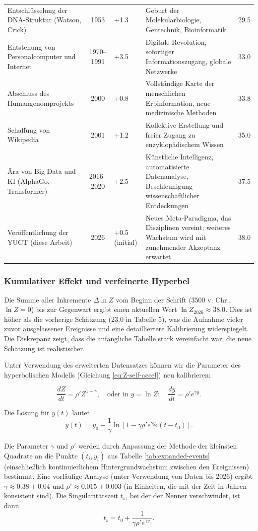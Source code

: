 \documentclass[12pt,a4paper]{article}
\theoremstyle{remark}
\begin{document}
\begin{table}[htbp]
\begin{tabular}{p{3.2cm} c p{2.5cm} p{4.5cm} c}
			Entschlüsselung der DNA-Struktur (Watson, Crick) & 1953 & +1.3 & Geburt der Molekularbiologie, Gentechnik, Bioinformatik & 29.5 \\
			Entstehung von Personalcomputer und Internet & 1970–1991 & +3.5 & Digitale Revolution, sofortiger Informationszugang, globale Netzwerke & 33.0 \\
			Abschluss des Humangenomprojekts & 2000 & +0.8 & Vollständige Karte der menschlichen Erbinformation, neue medizinische Methoden & 33.8 \\
			Schaffung von Wikipedia & 2001 & +1.2 & Kollektive Erstellung und freier Zugang zu enzyklopädischem Wissen & 35.0 \\
			Ära von Big Data und KI (AlphaGo, Transformer) & 2016–2020 & +2.5 & Künstliche Intelligenz, automatisierte Datenanalyse, Beschleunigung wissenschaftlicher Entdeckungen & 37.5 \\
			Veröffentlichung der YUCT (diese Arbeit) & 2026 & +0.5 (initial) & Neues Meta-Paradigma, das Disziplinen vereint; weiteres Wachstum wird mit zunehmender Akzeptanz erwartet & 38.0 \\
			\bottomrule
		\end{tabular}
	\end{table}
	
	\subsubsection{Kumulativer Effekt und verfeinerte Hyperbel}
	
	Die Summe aller Inkremente $\Delta \ln Z$ vom Beginn der Schrift (3500 v. Chr., $\ln Z=0$) bis zur Gegenwart ergibt einen aktuellen Wert $\ln Z_{2026} \approx 38.0$. Dies ist höher als die vorherige Schätzung (23.0 in Tabelle 5), was die Aufnahme vieler zuvor ausgelassener Ereignisse und eine detailliertere Kalibrierung widerspiegelt. Die Diskrepanz zeigt, dass die anfängliche Tabelle stark vereinfacht war; die neue Schätzung ist realistischer.
	
	Unter Verwendung des erweiterten Datensatzes können wir die Parameter des hyperbolischen Modells (Gleichung \eqref{eq:Z-self-accel}) neu kalibrieren:
	
	\[
	\frac{dZ}{dt} = \rho' Z^{1+\gamma}, \quad \text{oder in } y = \ln Z: \quad \frac{dy}{dt} = \rho' e^{\gamma y}.
	\]
	
	Die Lösung für $y(t)$ lautet
	\[
	y(t) = y_0 - \frac{1}{\gamma} \ln\left[1 - \gamma \rho' e^{\gamma y_0} (t - t_0)\right].
	\]
	
	Die Parameter $\gamma$ und $\rho'$ werden durch Anpassung der Methode der kleinsten Quadrate an die Punkte $(t_i, y_i)$ aus Tabelle \ref{tab:expanded-events} (einschließlich kontinuierlichem Hintergrundwachstum zwischen den Ereignissen) bestimmt. Eine vorläufige Analyse (unter Verwendung von Daten bis 2026) ergibt $\gamma \approx 0.38 \pm 0.04$ und $\rho' \approx 0.015 \pm 0.003$ (in Einheiten, die mit der Zeit in Jahren konsistent sind). Die Singularitätszeit $t_s$, bei der der Nenner verschwindet, ist dann
	\[
	t_s = t_0 + \frac{1}{\gamma \rho' e^{\gamma y_0}}.
	\]
	
\end{document}
